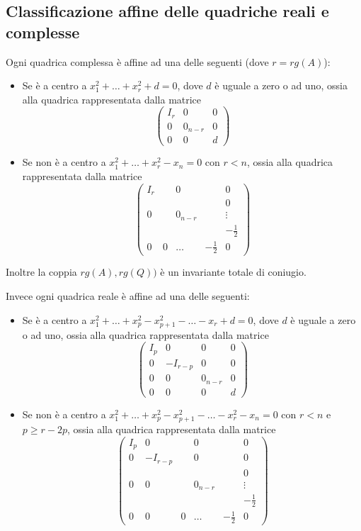  \subsection{Classificazione affine delle quadriche reali e complesse}
 \begin{theorem}
 Ogni quadrica complessa è affine ad una delle seguenti (dove $r=rg(A)$):
 \begin{itemize}
  \item Se è a centro a $x_1^2+\ldots+x_r^2+d=0$, dove $d$ è uguale a zero o ad uno, ossia alla quadrica rappresentata dalla matrice
  $$\left( \begin{array}{cc|c}
   I_r & 0 & 0\\
   0 & 0_{n-r} & 0\\
   \hline
   0 & 0 & d
  \end{array} \right)$$
  \item Se non è a centro a $x_1^2+\ldots+x_r^2-x_n=0$ con $r<n$, ossia alla quadrica rappresentata dalla matrice
  $$\left( \begin{array}{cccc|c}
   I_r & & 0 & & 0\\
   & & & & 0\\
   0 & & 0_{n-r} & & \vdots\\
   & & & & -\frac{1}{2}\\
   \hline
   0 & 0 &\dots & -\frac{1}{2} & 0
  \end{array} \right)$$
 \end{itemize}
 Inoltre la coppia $rg(A), rg(Q))$ è un invariante totale di coniugio.
 
 Invece ogni quadrica reale è affine ad una delle seguenti:
 \begin{itemize}
  \item Se è a centro a $x_1^2+\ldots+x_p^2-x_{p+1}^2-\ldots-x_r+d=0$, dove $d$ è uguale a zero o ad uno, ossia alla quadrica
  rappresentata dalla matrice $$\left( \begin{array}{ccc|c}
   I_p & 0 & 0 & 0 \\
   0 & -I_{r-p} & 0 & 0\\
   0 & 0 & 0_{n-r} & 0 \\
   \hline
   0 & 0 & 0 & d
  \end{array} \right)$$
  \item Se non è a centro a $x_1^2+\ldots+x_p^2-x_{p+1}^2-\ldots-x_r^2-x_n=0$ con $r<n$ e $p\ge r-2p$, ossia alla quadrica rappresentata dalla
  matrice
  $$\left( \begin{array}{ccccc|c}
   I_p & 0 & & 0 & & 0\\
   0 & -I_{r-p} & & 0 & & 0 \\
   & & & & & 0\\
   0 & 0 & & 0_{n-r} & & \vdots\\
   & & & & & -\frac{1}{2}\\
   \hline
   0 & 0 & 0 &\dots & -\frac{1}{2} & 0
  \end{array} \right)$$
 \end{itemize}
 \end{theorem}
